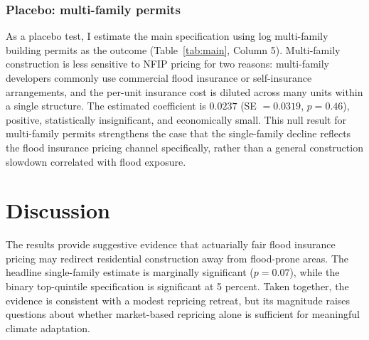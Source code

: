 \documentclass[12pt]{article}
\begin{document}
\subsubsection*{Placebo: multi-family permits} As a placebo test, I estimate the main specification using log multi-family building permits as the outcome (Table~\ref{tab:main}, Column 5). Multi-family construction is less sensitive to NFIP pricing for two reasons: multi-family developers commonly use commercial flood insurance or self-insurance arrangements, and the per-unit insurance cost is diluted across many units within a single structure. The estimated coefficient is $0.0237$ (SE $= 0.0319$, $p = 0.46$), positive, statistically insignificant, and economically small. This null result for multi-family permits strengthens the case that the single-family decline reflects the flood insurance pricing channel specifically, rather than a general construction slowdown correlated with flood exposure.


\section{Discussion}
\label{sec:discussion}

The results provide suggestive evidence that actuarially fair flood insurance pricing may redirect residential construction away from flood-prone areas. The headline single-family estimate is marginally significant ($p = 0.07$), while the binary top-quintile specification is significant at 5 percent. Taken together, the evidence is consistent with a modest repricing retreat, but its magnitude raises questions about whether market-based repricing alone is sufficient for meaningful climate adaptation.
\end{document}
